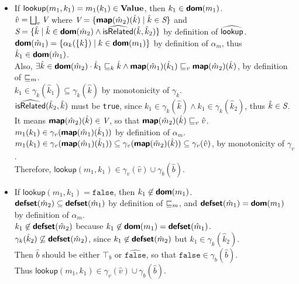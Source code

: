 \begin{itemize}
\item If $\textsf{lookup}(m_1, k_1) = m_1(k_1) \in \textbf{Value}$, then $k_1 \in \textsf{\textbf{dom}}(m_1)$.\\
$\hat{v} = \bigsqcup_v \emph{V}$
where $\emph{V} = \{ \textsf{\textbf{map}}(\hat{m}_2)(\hat{k}) \mid \hat{k} \in \emph{S} \}$
and $\emph{S} = \{ \hat{k} \mid \hat{k} \in \textsf{\textbf{dom}}(\hat{m}_2) \land \widehat{\textsf{isRelated}}(\hat{k}, \hat{k}_2) \}$
by definition of $\widehat{\textsf{lookup}}$. \vspace{1mm} \\
$\textsf{\textbf{dom}}(\hat{m}_1)  = \{ \alpha_k(\{k\}) \mid k \in \textsf{\textbf{dom}}(m_1) \}$
by definition of $\alpha_m$, thus $\hat{k}_1 \in \textsf{\textbf{dom}}(\hat{m}_1)$.\\
Also, $\exists \hat{k} \in \textsf{\textbf{dom}}(\hat{m}_2) 
\cdot \hat{k}_1 \sqsubseteq_k \hat{k} \land \textsf{\textbf{map}}(\hat{m}_1)(\hat{k}_1) \sqsubseteq_v \textsf{\textbf{map}}(\hat{m}_2)(\hat{k})$,
by definition of $\sqsubseteq_m$.\\
$k_1 \in \gamma_k(\hat{k}_1) \subseteq \gamma_k(\hat{k})$ by monotonicity of $\gamma_k$.\\ 
$\widehat{\textsf{isRelated}}(\hat{k}_2, \hat{k})$ must be \texttt{true},
since $k_1 \in \gamma_k(\hat{k}) \land k_1 \in \gamma_k(\hat{k}_2)$,
thus $\hat{k} \in \emph{S} $.\\
It means $\textsf{\textbf{map}}(\hat{m}_2)(\hat{k}) \in \emph{V}$,
so that $\textsf{\textbf{map}}(\hat{m}_2)(\hat{k}) \sqsubseteq_v \hat{v}$. \vspace{1mm} \\
$m_1(k_1) \in \gamma_v (\textsf{\textbf{map}}(\hat{m}_1)(\hat{k}_1))$ by definition of $\alpha_m$.\\
$m_1(k_1) \in \gamma_v (\textsf{\textbf{map}}(\hat{m}_1)(\hat{k}_1))
\subseteq \gamma_v (\textsf{\textbf{map}}(\hat{m}_2)(\hat{k})) \subseteq \gamma_v (\hat{v})$,
by monotonicity of $\gamma_v$.\\
Therefore, $\textsf{lookup}(m_1, k_1) \in \gamma_v(\hat{v}) \cup \gamma_b(\hat{b})$.
\item If $\textsf{lookup}(m_1, k_1) = \texttt{false}$, then $k_1 \not\in \textsf{\textbf{dom}}(m_1)$.\\
$\textsf{\textbf{defset}}(\hat{m}_2) \subseteq \textsf{\textbf{defset}}(\hat{m}_1)$ by definition of $\sqsubseteq_m$,
and $\textsf{\textbf{defset}}(\hat{m}_1) = \textsf{\textbf{dom}}(m_1)$ by definition of $\alpha_m$.\\
$k_1 \not\in \textsf{\textbf{defset}}(\hat{m}_2)$ because $k_1 \not\in \textsf{\textbf{dom}}(m_1) = \textsf{\textbf{defset}}(\hat{m}_1)$. \\
$\gamma_k(\hat{k}_2) \not\subseteq \textsf{\textbf{defset}}(\hat{m}_2)$, since
$k_1 \not\in \textsf{\textbf{defset}}(\hat{m}_2)$ but $k_1 \in \gamma_k(\hat{k}_2)$.\\
Then $\hat{b}$ should be either $\top_b$ or $\hat{\texttt{false}}$,
so that $\texttt{false} \in \gamma_b(\hat{b})$. \\
Thus $\textsf{lookup}(m_1, k_1) \in \gamma_v(\hat{v}) \cup \gamma_b(\hat{b})$.
\end{itemize}



